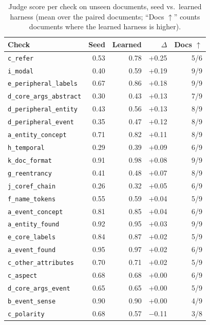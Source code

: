 \begin{table}[t]
\centering\small
\setlength{\tabcolsep}{4pt}
\begin{tabular}{@{}lrrrr@{}}
\toprule
Check & Seed & Learned & $\Delta$ & Docs $\uparrow$ \\
\midrule
\texttt{c\_refer} & 0.53 & 0.78 & +0.25 & 5/6 \\
\texttt{i\_modal} & 0.40 & 0.59 & +0.19 & 9/9 \\
\texttt{e\_peripheral\_labels} & 0.67 & 0.86 & +0.18 & 9/9 \\
\texttt{d\_core\_args\_abstract} & 0.30 & 0.43 & +0.13 & 7/9 \\
\texttt{d\_peripheral\_entity} & 0.43 & 0.56 & +0.13 & 8/9 \\
\texttt{d\_peripheral\_event} & 0.35 & 0.47 & +0.12 & 8/9 \\
\texttt{a\_entity\_concept} & 0.71 & 0.82 & +0.11 & 8/9 \\
\texttt{h\_temporal} & 0.29 & 0.39 & +0.09 & 6/9 \\
\texttt{k\_doc\_format} & 0.91 & 0.98 & +0.08 & 9/9 \\
\texttt{g\_reentrancy} & 0.41 & 0.48 & +0.07 & 8/9 \\
\texttt{j\_coref\_chain} & 0.26 & 0.32 & +0.05 & 6/9 \\
\texttt{f\_name\_tokens} & 0.55 & 0.59 & +0.04 & 5/9 \\
\texttt{a\_event\_concept} & 0.81 & 0.85 & +0.04 & 6/9 \\
\texttt{a\_entity\_found} & 0.92 & 0.95 & +0.03 & 9/9 \\
\texttt{e\_core\_labels} & 0.84 & 0.87 & +0.02 & 5/9 \\
\texttt{a\_event\_found} & 0.95 & 0.97 & +0.02 & 6/9 \\
\texttt{c\_other\_attributes} & 0.70 & 0.71 & +0.02 & 5/9 \\
\texttt{c\_aspect} & 0.68 & 0.68 & +0.00 & 6/9 \\
\texttt{d\_core\_args\_event} & 0.65 & 0.65 & +0.00 & 5/9 \\
\texttt{b\_event\_sense} & 0.90 & 0.90 & +0.00 & 4/9 \\
\texttt{c\_polarity} & 0.68 & 0.57 & $-$0.11 & 3/8 \\
\bottomrule
\end{tabular}
\caption{Judge score per check on unseen documents, seed vs.\ learned harness (mean over the paired documents; ``Docs $\uparrow$'' counts documents where the learned harness is higher).}
\label{tab:category}
\end{table}
